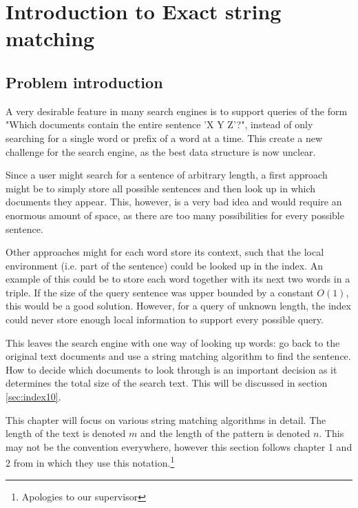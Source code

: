 \section{Introduction to Exact string matching}

\subsection{Problem introduction}

A very desirable feature in many search engines is to support queries of the form "Which documents contain the entire sentence 'X Y Z'?", instead of only searching for a single word or prefix of a word at a time. This create a new challenge for the search engine, as the best data structure is now unclear. 

Since a user might search for a sentence of arbitrary length, a first approach might be to simply store all possible sentences and then look up in which documents they appear. This, however, is a very bad idea and would require an enormous amount of space, as there are too many possibilities for every possible sentence. 

Other approaches might for each word store its context, such that the local environment (i.e. part of the sentence) could be looked up in the index. An example of this could be to store each word together with its next two words in a triple. If the size of the query sentence was upper bounded by a constant $O(1)$, this would be a good solution. However, for a query of unknown length, the index could never store enough local information to support every possible query. 


This leaves the search engine with one way of looking up words: go back to the original text documents and use a string matching algorithm to find the sentence. How to decide which documents to look through is an important decision as it determines the total size of the search text. This will be discussed in section \ref{sec:index10}. 

This chapter will focus on various string matching algorithms in detail. The length of the text is denoted $m$ and the length of the pattern is denoted $n$. This may not be the convention everywhere, however this section follows chapter 1 and 2 from \cite{Gusfield1997AlgorithmsOS} in which they use this notation.\footnote{Apologies to our supervisor}

